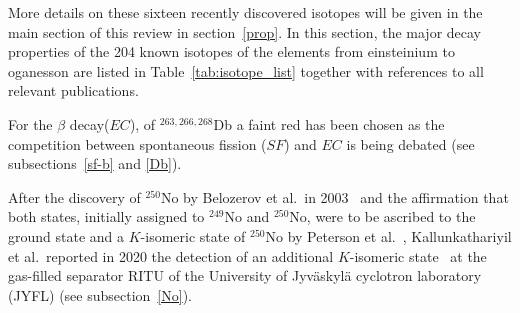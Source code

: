 

More details on these sixteen recently discovered isotopes will be given in the main section of this review in section~\ref{prop}. 
In this section, the major decay properties of the 204 known isotopes of the elements from einsteinium to oganesson are listed in Table~\ref{tab:isotope_list} together with references to all relevant publications.

For the $\beta$ decay($EC$), of $^{263,266,268}$Db a faint red has been chosen as the competition between spontaneous fission ($SF$) and $EC$ is being debated (see subsections~\ref{sf-b} and \ref{Db}). 

After the discovery of $^{250}$No by Belozerov et al.~in 2003~\cite{Belozerov2003} and the affirmation that both states, initially assigned to $^{249}$No and $^{250}$No, were to be ascribed to the ground state and a $K$-isomeric state of $^{250}$No by Peterson et al.~\cite{Peterson2006}, Kallunkathariyil et al.~reported in 2020 the detection of an additional $K$-isomeric state~\cite{Kallunkathariyil2020} at the gas-filled separator RITU of the University of Jyv\"{a}skyl\"{a} cyclotron laboratory (JYFL) (see subsection~\ref{No}). 

